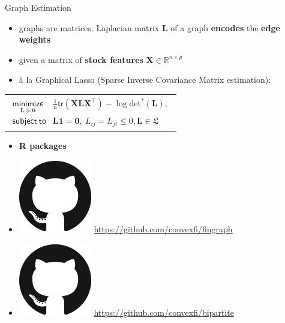 \documentclass[aspectratio=169]{beamer}
\begin{document}
\begin{frame}{Graph Estimation}
  \begin{itemize}
    \pause
    \item graphs are matrices: Laplacian matrix $\bm{L}$ of a graph \textbf{encodes} the \textbf{edge weights}
    \pause
    \item given a matrix of \textbf{stock features} $\bm{X} \in \mathbb{R}^{n\times p}$
    \pause
    \item \`a la Graphical Lasso (Sparse Inverse Covariance Matrix estimation):
  \end{itemize}
  \begin{center}
    \begin{tabular}{@{}l@{}}
        \large
        $
    \begin{array}{cl}
      \underset{\bm{L} \succeq \mathbf{0}}{\mathsf{minimize}} & \frac{1}{n}\mathsf{tr}\left(\bm{X}\bm{L}\bm{X}^\top\right)
      - \log\mathrm{det}^{*}\left(\bm{L}\right),\\
      \mathsf{subject~to} & \bm{L}\mathbf{1} = \mathbf{0},~L_{ij} = L_{ji} \leq 0, \bm{L} \in \mathfrak{L}
    \end{array}
        $
    \end{tabular}
\end{center}
\pause
\begin{itemize}
  \item \textbf{R packages}
\end{itemize}
\begin{itemize}
  \item[] \includegraphics[scale=.1]{figures/github.png} \url{https://github.com/convexfi/fingraph}
  \item[] \includegraphics[scale=.1]{figures/github.png} \url{https://github.com/convexfi/bipartite}
\end{itemize}

\end{frame}
\end{document}

